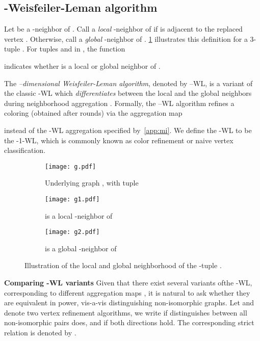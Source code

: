 \documentclass{article}
\newcommand{\xhdr}[1]{{\noindent\bfseries #1}}
\theoremstyle{definition}
\newcommand{\new}[1]{\emph{#1}}
\newcommand{\kwl}{-\textsf{WL}\xspace}
\newcommand{\deltakwl}{--\textsf{WL}\xspace}
\begin{document}
\subsection{-Weisfeiler-Leman algorithm} 

Let  be a -{neighbor} of . Call  a \new{local} -neighbor of  if  is adjacent to the replaced vertex . Otherwise, call  a \new{global} -neighbor of . \cref{kwlill} illustrates this definition for a 3-tuple .
For tuples  and  in , the function

indicates whether  is a local or global neighbor of . 

The \new{--dimensional Weisfeiler-Leman algorithm}, denoted by \deltakwl, is a variant of the classic \kwl which \emph{differentiates} between the local and the global neighbors during neighborhood aggregation \cite{Mal2014}. Formally, the \deltakwl algorithm refines a coloring  (obtained after  rounds) via the aggregation map 

instead of the \kwl aggregation specified by~\cref{app:mi}. We define the -\textsf{WL} to be the -1-\textsf{WL}, which is commonly known as color refinement or naive vertex classification.
\begin{figure}[t]
	\begin{center}
		\begin{subfigure}[c]{0.28\textwidth}
			\centering
			\texttt{[image: g.pdf]}
			\caption{Underlying graph , with tuple }
		\end{subfigure}\hspace{10pt}
		\begin{subfigure}[c]{0.28\textwidth}
			\centering
			\texttt{[image: g1.pdf]}
			\caption{ is a local -neighbor of   }
		\end{subfigure}\hspace{10pt}
		\begin{subfigure}[c]{0.28\textwidth}
			\centering
			\texttt{[image: g2.pdf]}
			\caption{ is a global -neighbor of }
		\end{subfigure}
	\end{center}
	\caption{Illustration of the local and global neighborhood of the -tuple .}\label{kwlill}
\end{figure}


\xhdr{Comparing -\textsf{WL} variants} Given that there exist several variants ofthe \kwl, corresponding to different aggregation maps , it is natural to ask whether they are equivalent in power, vis-a-vis distinguishing non-isomorphic graphs. Let  and  denote two vertex refinement algorithms, we write
 if  distinguishes between all non-isomorphic pairs  does, and  if both directions hold. The corresponding strict relation is denoted by . 
\end{document}
